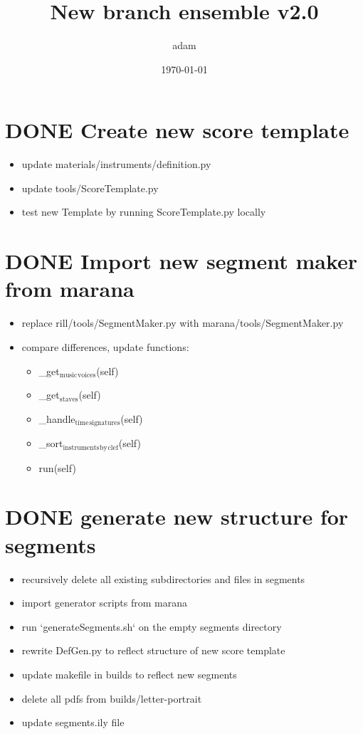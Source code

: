 \documentclass[11pt]{article}
\author{adam}
\date{\today}
\title{New branch ensemble v2.0}
\begin{document}
\maketitle
\section*{{\bfseries\sffamily DONE} Create new score template}
\label{sec:org1e5c2be}
\begin{itemize}
\item update materials/instruments/definition.py
\item update tools/ScoreTemplate.py
\item test new Template by running ScoreTemplate.py locally
\end{itemize}

\section*{{\bfseries\sffamily DONE} Import new segment maker from marana}
\label{sec:orgf8e824f}
\begin{itemize}
\item replace rill/tools/SegmentMaker.py with marana/tools/SegmentMaker.py
\item compare differences, update functions:
\begin{itemize}
\item \_get\(_{\text{music}}\)\(_{\text{voices}}\)(self)
\item \_get\(_{\text{staves}}\)(self)
\item \_handle\(_{\text{time}}\)\(_{\text{signatures}}\)(self)
\item \_sort\(_{\text{instruments}}\)\(_{\text{by}}\)\(_{\text{clef}}\)(self)
\item run(self)
\end{itemize}
\end{itemize}

\section*{{\bfseries\sffamily DONE} generate new structure for segments}
\label{sec:org23fd2c5}
\begin{itemize}
\item recursively delete all existing subdirectories and files in segments
\item import generator scripts from marana
\item run `generateSegments.sh` on the empty segments directory
\item rewrite DefGen.py to reflect structure of new score template
\item update makefile in builds to reflect new segments
\item delete all pdfs from builds/letter-portrait
\item update segments.ily file
\end{itemize}
\end{document}
